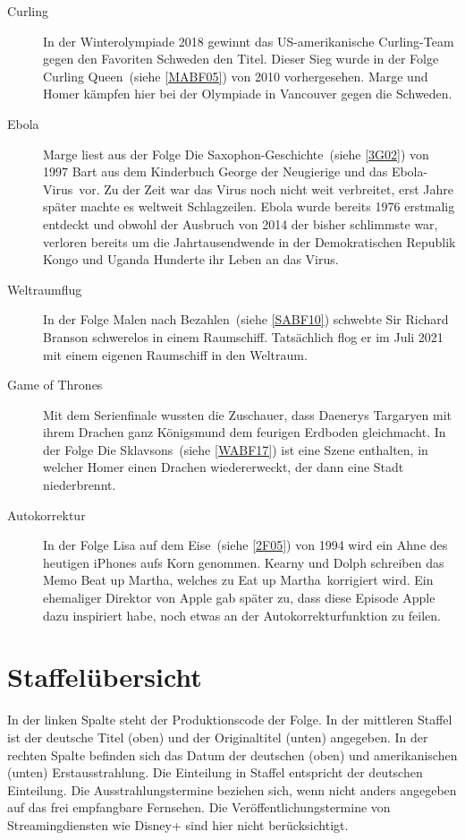 \begin{appendix}
\begin{description}
  \item[Curling] In der Winterolympiade 2018 gewinnt das US-amerikanische Curling-Team gegen den Favoriten Schweden den Titel. Dieser Sieg wurde in der Folge \glqq Curling Queen\grqq\ (siehe \ref{MABF05}) von 2010 vorhergesehen. Marge und Homer kämpfen hier bei der Olympiade in Vancouver gegen die Schweden.
  \item[Ebola] Marge liest aus der Folge \glqq Die Saxophon-Geschichte\grqq\ (siehe \ref{3G02}) von 1997 Bart aus dem Kinderbuch \glqq George der Neugierige und das Ebola-Virus\grqq\ vor. Zu der Zeit war das Virus noch nicht weit verbreitet, erst Jahre später machte es weltweit Schlagzeilen. Ebola wurde bereits 1976 erstmalig entdeckt und obwohl der Ausbruch von 2014 der bisher schlimmste war, verloren bereits um die Jahrtausendwende in der Demokratischen Republik Kongo und Uganda Hunderte ihr Leben an das Virus.
  \item[Weltraumflug] In der Folge \glqq Malen nach Bezahlen\grqq\ (siehe \ref{SABF10}) schwebte Sir Richard Branson schwerelos in einem Raumschiff. Tatsächlich flog er im Juli 2021 mit einem eigenen Raumschiff in den Weltraum.
  \item[Game of Thrones] Mit dem Serienfinale wussten die Zuschauer, dass Daenerys Targaryen mit ihrem Drachen ganz Königsmund dem feurigen Erdboden gleichmacht. In der Folge \glqq Die Sklavsons\grqq\ (siehe \ref{WABF17}) ist eine Szene enthalten, in welcher Homer einen Drachen wiedererweckt, der dann eine Stadt niederbrennt.
  \item[Autokorrektur] In der Folge \glqq Lisa auf dem Eise\grqq\ (siehe \ref{2F05}) von 1994 wird ein Ahne des heutigen iPhones aufs Korn genommen. Kearny und Dolph schreiben das Memo \glqq Beat up Martha\grqq, welches zu \glqq Eat up Martha\grqq\ korrigiert wird. Ein ehemaliger Direktor von Apple gab später zu, dass diese Episode Apple dazu inspiriert habe, noch etwas an der Autokorrekturfunktion zu feilen.
\end{description}

\section{Staffelübersicht}\label{StaffelUebersicht}
In der linken Spalte steht der Produktionscode der Folge. In der mittleren Staffel ist der deutsche Titel (oben) und der Originaltitel (unten) angegeben. In der rechten Spalte befinden sich das Datum der deutschen (oben) und amerikanischen (unten) Erstausstrahlung. Die Einteilung in Staffel entspricht der deutschen Einteilung. Die Ausstrahlungstermine beziehen sich, wenn nicht anders angegeben auf das frei empfangbare Fernsehen. Die Veröffentlichungstermine von Streamingdiensten wie Disney+ sind hier nicht berücksichtigt.


\end{appendix}
